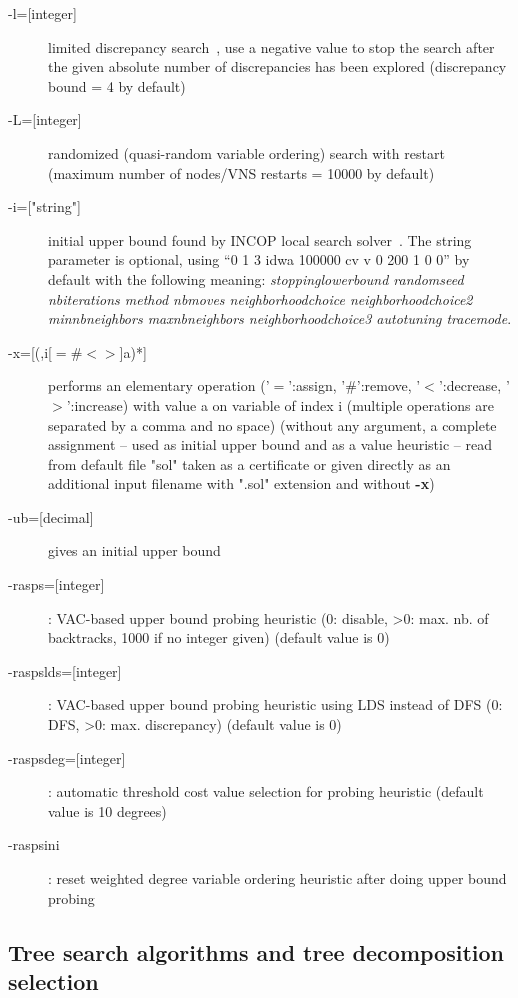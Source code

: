 \documentclass{article}
\begin{document}
\begin{description}
\item[{-l=[integer]}] limited discrepancy search~\cite{Ginsberg95}, use a negative value to stop the search after the given absolute number of discrepancies has been explored (discrepancy bound = 4 by default)
\item[{-L=[integer]}] randomized (quasi-random variable ordering) search with restart (maximum number of nodes/VNS restarts = 10000 by default)
\item[{-i=["string"]}] initial upper bound found by INCOP local search
  solver~\cite{idwalk:cp04}. The string parameter is optional, using ``0 1 3 idwa 100000
  cv v 0 200 1 0 0'' by default with the following meaning:
  {\em stoppinglowerbound randomseed nbiterations method nbmoves
  neighborhoodchoice neighborhoodchoice2 minnbneighbors maxnbneighbors
  neighborhoodchoice3 autotuning tracemode}.
\item[{-x=[(,i[$=\#<>$]a)*]}] performs an elementary operation ('$=$':assign, '$\#$':remove, '$<$':decrease, '$>$':increase) with value a on variable of index i (multiple operations are separated by a comma and no space) (without any
  argument, a complete assignment -- used as initial upper bound and
  as a value heuristic -- read from default file "sol" taken as a certificate or given directly as an additional input
  filename with ".sol" extension and without {\bf -x})
\item[{-ub=[decimal]}] gives an initial upper bound
\item[{-rasps=[integer]}] : VAC-based upper bound probing heuristic (0: disable, >0: max. nb. of backtracks, 1000 if no integer given) (default value is 0)
\item[{-raspslds=[integer]}] : VAC-based upper bound probing heuristic using LDS instead of DFS (0: DFS, >0: max. discrepancy) (default value is 0)
\item[{-raspsdeg=[integer]}] : automatic threshold cost value selection for probing heuristic (default value is 10 degrees)
\item[{-raspsini}] : reset weighted degree variable ordering heuristic after doing upper bound probing
\end{description}

\subsection{Tree search algorithms and tree decomposition selection}
\end{document}
